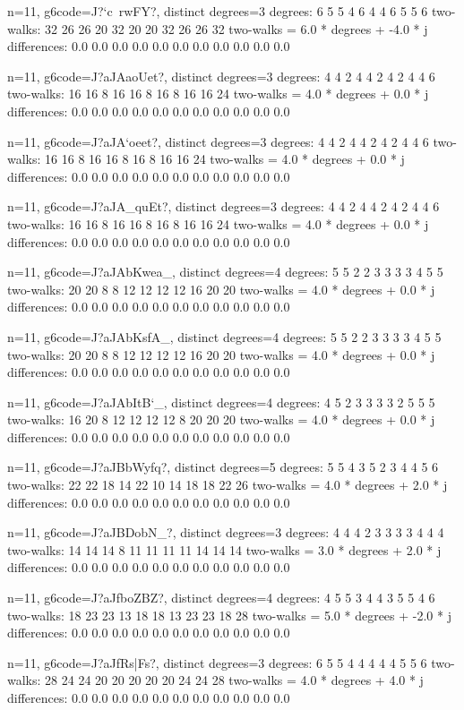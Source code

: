 {{{{{{{{{{{{{{{{n=11, g6code=J?`c~rw}FY?, distinct degrees=3
degrees: 6 5 5 4 6 4 4 6 5 5 6 
two-walks: 32 26 26 20 32 20 20 32 26 26 32 
two-walks = 6.0 * degrees + -4.0 * j
differences: 0.0 0.0 0.0 0.0 0.0 0.0 0.0 0.0 0.0 0.0 0.0 

n=11, g6code=J?aJAaoUet?, distinct degrees=3
degrees: 4 4 2 4 4 2 4 2 4 4 6 
two-walks: 16 16 8 16 16 8 16 8 16 16 24 
two-walks = 4.0 * degrees + 0.0 * j
differences: 0.0 0.0 0.0 0.0 0.0 0.0 0.0 0.0 0.0 0.0 0.0 

n=11, g6code=J?aJA`oeet?, distinct degrees=3
degrees: 4 4 2 4 4 2 4 2 4 4 6 
two-walks: 16 16 8 16 16 8 16 8 16 16 24 
two-walks = 4.0 * degrees + 0.0 * j
differences: 0.0 0.0 0.0 0.0 0.0 0.0 0.0 0.0 0.0 0.0 0.0 

n=11, g6code=J?aJA_quEt?, distinct degrees=3
degrees: 4 4 2 4 4 2 4 2 4 4 6 
two-walks: 16 16 8 16 16 8 16 8 16 16 24 
two-walks = 4.0 * degrees + 0.0 * j
differences: 0.0 0.0 0.0 0.0 0.0 0.0 0.0 0.0 0.0 0.0 0.0 

n=11, g6code=J?aJAbKwea_, distinct degrees=4
degrees: 5 5 2 2 3 3 3 3 4 5 5 
two-walks: 20 20 8 8 12 12 12 12 16 20 20 
two-walks = 4.0 * degrees + 0.0 * j
differences: 0.0 0.0 0.0 0.0 0.0 0.0 0.0 0.0 0.0 0.0 0.0 

n=11, g6code=J?aJAbKsfA_, distinct degrees=4
degrees: 5 5 2 2 3 3 3 3 4 5 5 
two-walks: 20 20 8 8 12 12 12 12 16 20 20 
two-walks = 4.0 * degrees + 0.0 * j
differences: 0.0 0.0 0.0 0.0 0.0 0.0 0.0 0.0 0.0 0.0 0.0 

n=11, g6code=J?aJAbItB`_, distinct degrees=4
degrees: 4 5 2 3 3 3 3 2 5 5 5 
two-walks: 16 20 8 12 12 12 12 8 20 20 20 
two-walks = 4.0 * degrees + 0.0 * j
differences: 0.0 0.0 0.0 0.0 0.0 0.0 0.0 0.0 0.0 0.0 0.0 

n=11, g6code=J?aJBbWyfq?, distinct degrees=5
degrees: 5 5 4 3 5 2 3 4 4 5 6 
two-walks: 22 22 18 14 22 10 14 18 18 22 26 
two-walks = 4.0 * degrees + 2.0 * j
differences: 0.0 0.0 0.0 0.0 0.0 0.0 0.0 0.0 0.0 0.0 0.0 

n=11, g6code=J?aJBDobN_?, distinct degrees=3
degrees: 4 4 4 2 3 3 3 3 4 4 4 
two-walks: 14 14 14 8 11 11 11 11 14 14 14 
two-walks = 3.0 * degrees + 2.0 * j
differences: 0.0 0.0 0.0 0.0 0.0 0.0 0.0 0.0 0.0 0.0 0.0 

n=11, g6code=J?aJfboZBZ?, distinct degrees=4
degrees: 4 5 5 3 4 4 3 5 5 4 6 
two-walks: 18 23 23 13 18 18 13 23 23 18 28 
two-walks = 5.0 * degrees + -2.0 * j
differences: 0.0 0.0 0.0 0.0 0.0 0.0 0.0 0.0 0.0 0.0 0.0 

n=11, g6code=J?aJfRs|Fs?, distinct degrees=3
degrees: 6 5 5 4 4 4 4 4 5 5 6 
two-walks: 28 24 24 20 20 20 20 20 24 24 28 
two-walks = 4.0 * degrees + 4.0 * j
differences: 0.0 0.0 0.0 0.0 0.0 0.0 0.0 0.0 0.0 0.0 0.0 

}}}}}}}}}}}}}}}
